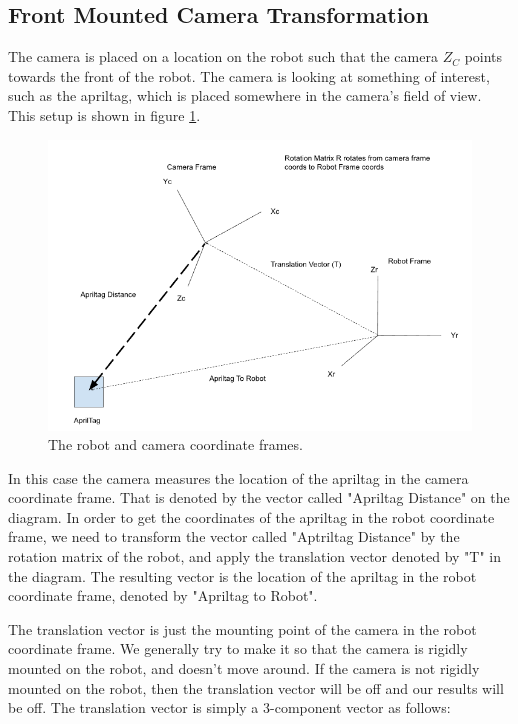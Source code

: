 \documentclass[11pt]{article}
\begin{document}
\subsection{Front Mounted Camera Transformation}

The camera is placed on a location on the robot such that the camera $Z_C$ points towards
the front of the robot.  The camera is looking at something of interest, such as the apriltag,
which is placed somewhere in the camera's field of view.  This setup is shown in figure \ref{fig:robot}.

\begin{figure}[h!]
    \centering
    \includegraphics[scale=0.5]{figures/robot.png}
    \caption{The robot and camera coordinate frames.}
    \label{fig:robot}
\end{figure}


In this case the camera measures the location of the apriltag in the camera coordinate frame.
That is denoted by the vector called "Apriltag Distance" on the diagram.  In order to get the
coordinates of the apriltag in the robot coordinate frame, we need to transform the vector
called "Aptriltag Distance" by the rotation matrix of the robot, and apply the translation
vector denoted by "T" in the diagram.  The resulting vector is the location of the apriltag
in the robot coordinate frame, denoted by "Apriltag to Robot".

The translation vector is just the mounting point of the camera in the robot coordinate frame.
We generally try to make it so that the camera is rigidly mounted on the robot, and
doesn't move around.  If the camera is not rigidly mounted on the robot, then the translation vector
will be off and our results will be off.  The translation vector is simply a 3-component vector
as follows:
\end{document}
